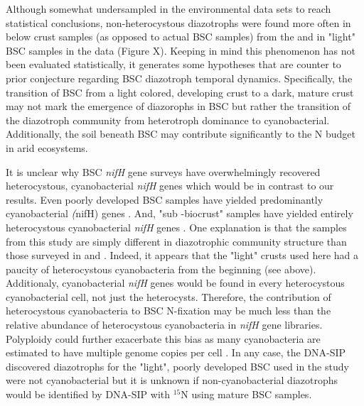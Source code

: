 Although somewhat undersampled in the environmental data sets to reach statistical conclusions, non-heterocystous diazotrophs were found more often in below crust samples (as opposed to actual BSC samples) from the \citet{Steven_2013} and in "light" BSC samples in the \citet{Garcia_Pichel_2013} data (Figure X). Keeping in mind this phenomenon has not been evaluated statistically, it generates some hypotheses that are counter to prior conjecture regarding BSC diazotroph temporal dynamics. Specifically, the transition of BSC from a light colored, developing crust to a dark, mature crust may not mark the emergence of diazorophs in BSC but rather the transition of the diazotroph community from heterotroph dominance to cyanobacterial. Additionally, the soil beneath BSC may contribute significantly to the N budget in arid ecosystems.

It is unclear why BSC \textit{nifH} gene surveys have overwhelmingly recovered heterocystous, cyanobacterial \textit{nifH} genes which would be in contrast to our results. Even poorly developed BSC samples have yielded predominantly cyanobacterial \textit(nifH) genes \cite{14766579}. And, "sub -biocrust" samples have yielded entirely heterocystous cyanobacterial \textit{nifH} genes \cite{Yeager_2012}. One explanation is that the samples from this study are simply different in diazotrophic community structure than those surveyed in \citet{Yeager} \citet{14766579} and \citet{Yeager_2012}. Indeed, it appears that the "light" crusts used here had a paucity of heterocystous cyanobacteria from the beginning (see above). Additionaly, cyanobacterial \textit{nifH} genes would be found in every heterocystous cyanobacterial cell, not just the heterocysts. Therefore, the contribution of heterocystous cyanobacteria to BSC N-fixation may be much less than the relative abundance of heterocystous cyanobacteria in \textit{nifH} gene libraries. Polyploidy could further exacerbate this bias as many cyanobacteria are estimated to have multiple genome copies per cell \cite{Griese_2011}. In any case, the DNA-SIP discovered diazotrophs for the "light", poorly developed BSC used in the study were not cyanobacterial but it is unknown if non-cyanobacterial diazotrophs would be identified by DNA-SIP with $^{15}$N using mature BSC samples. 

